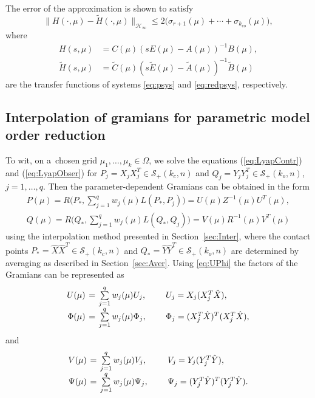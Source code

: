 The error of the approximation is shown to satisfy 
\begin{equation*}%
\|H(\cdot,\mu)-\tilde{H}(\cdot,\mu)\|_{\mathcal{H}_\infty} \leq 2\bigl(\sigma_{r+1}(\mu) + \cdots + \sigma_{k_{co}}(\mu)\bigr),
\end{equation*}
where 
\begin{align*}
H(s,\mu)& =C(\mu)(sE(\mu)-A(\mu))^{-1}B(\mu), \\
\tilde{H}(s,\mu)&=\tilde{C}(\mu)(s\tilde{E}(\mu)-\tilde{A}(\mu))^{-1}\tilde{B}(\mu)
\end{align*}
are the transfer functions of systems \eqref{eq:psys} and \eqref{eq:redpsys}, respectively. 
\subsection{Interpolation of gramians for parametric model order reduction}
To wit, 
on a~chosen grid $\mu_1,\ldots,\mu_k \in \Omega$, we solve the equations (\ref{eq:LyapContr}) and (\ref{eq:LyapObser}) 
for $P_j=X_j^{}X_j^T\in\mathcal{S}_+(k_c,n)$ and $Q_j=Y_j^{}Y_j^T\in\mathcal{S}_+(k_o,n)$, $j=1,\ldots,q$. Then the parameter-dependent Gramians can be obtained in the form
\begin{align*}
P(\mu) =R\bigl(P_*, \sum_{j=1}^q w_j(\mu) L(P_*,P_j)\bigr)=U(\mu)Z^{-1}\!(\mu)U^T(\mu), \\
Q(\mu) =R\bigl(Q_*, \sum_{j=1}^q w_j(\mu) L(Q_*,Q_j)\bigr)=V(\mu)R^{-1}\!(\mu)V^T(\mu)
\end{align*}
using the interpolation method presented in Section~\ref{sec:Inter}, where the contact points 
$P_*=\hat{X}\hat{X}^T\in\mathcal{S}_+(k_c,n)$ and $Q_*=\hat{Y}\hat{Y}^T\in\mathcal{S}_+(k_o,n)$ are determined by averaging as described in Section~\ref{sec:Aver}. Using \eqref{eq:UPhi} the factors of the Gramians can be represented as
\begin{equation}
\arraycolsep=2pt
\begin{array}{rcll}
U(\mu) & = & \sum\limits_{j=1}^q w_j(\mu) U_j, & \qquad U_j=X_j(X_j^T \hat{X}),\\
\Phi(\mu) & = & \sum\limits_{j=1}^q w_j(\mu) \Phi_j, & \qquad \Phi_j=(X_j^T \hat{X})^T(X_j^T \hat{X}),
\end{array}
\label{eq:UPhimu}
\end{equation}
and 
\begin{equation}
\arraycolsep=2pt
\begin{array}{rcll}
V(\mu) & = & \sum\limits_{j=1}^q w_j(\mu) V_j, & \qquad V_j=Y_j(Y_j^T \hat{Y}), \\
\Psi(\mu) & = & \sum\limits_{j=1}^q w_j(\mu) \Psi_j, & \qquad \Psi_j=(Y_j^T \hat{Y})^T(Y_j^T \hat{Y}).
\end{array}
\label{eq:VPsimu}
\end{equation}
